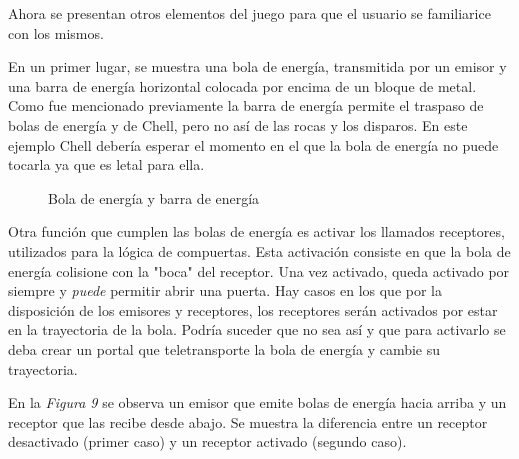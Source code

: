 \documentclass[a4paper]{article}
\begin{document}
Ahora se presentan otros elementos del juego para que el usuario se familiarice con los mismos. 

En un primer lugar, se muestra una bola de energía, transmitida por un emisor y una barra de energía horizontal colocada por encima de un bloque de metal. Como fue mencionado previamente la barra de energía permite el traspaso de bolas de energía y de Chell, pero no así de las rocas y los disparos. En este ejemplo Chell debería esperar el momento en el que la bola de energía no puede tocarla ya que es letal para ella.

\begin{figure}[!h]
	\caption{Bola de energía y barra de energía}
	\label{fig:diagrama8}
\end{figure}

\newpage

Otra función que cumplen las bolas de energía es activar los llamados receptores, utilizados para la lógica de compuertas. Esta activación consiste en que la bola de energía colisione con la "boca" del receptor. Una vez activado, queda activado por siempre y \textit{puede} permitir abrir una puerta. Hay casos en los que por la disposición de los emisores y receptores, los receptores serán activados por estar en la trayectoria de la bola. Podría suceder que no sea así y que para activarlo se deba crear un portal que teletransporte la bola de energía y cambie su trayectoria.

En la \textit{Figura 9} se observa un emisor que emite bolas de energía hacia arriba y un receptor que las recibe desde abajo. Se muestra la diferencia entre un receptor desactivado (primer caso) y un receptor activado (segundo caso).
\end{document}
